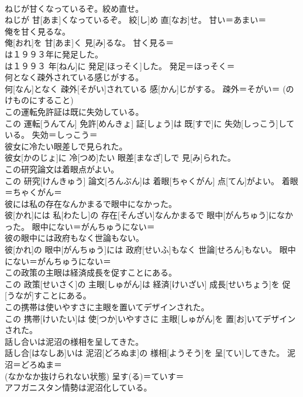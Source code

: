 \documentclass[8pt]{extreport}
\begin{document}
\begin{CJK}{UTF8}{min}
{\\	ねじが甘くなっているぞ。絞め直せ。	
\\	ねじが 甘[あま]くなっているぞ。 絞[し]め 直[なお]せ。	甘い＝あまい＝ 
\\	俺を甘く見るな。	
\\	俺[おれ]を 甘[あま]く 見[み]るな。	甘く見る＝ 
\\	は１９９３年に発足した。	
\\	は１９９３ 年[ねん]に 発足[ほっそく]した。	発足＝ほっそく＝ 
\\	何となく疎外されている感じがする。	
\\	何[なん]となく 疎外[そがい]されている 感[かん]じがする。	疎外＝そがい＝ (のけものにすること) 
\\	この運転免許証は既に失効している。	
\\	この 運転[うんてん] 免許[めんきょ] 証[しょう]は 既[すで]に 失効[しっこう]している。	失効＝しっこう＝ 
\\	彼女に冷たい眼差しで見られた。	
\\	彼女[かのじょ]に 冷[つめ]たい 眼差[まなざ]しで 見[み]られた。	
\\	この研究論文は着眼点がよい。	
\\	この 研究[けんきゅう] 論文[ろんぶん]は 着眼[ちゃくがん] 点[てん]がよい。	着眼＝ちゃくがん＝ 
\\	彼には私の存在なんかまるで眼中になかった。	
\\	彼[かれ]には 私[わたし]の 存在[そんざい]なんかまるで 眼中[がんちゅう]になかった。	眼中にない＝がんちゅうにない＝ 
\\	彼の眼中には政府もなく世論もない。	
\\	彼[かれ]の 眼中[がんちゅう]には 政府[せいふ]もなく 世論[せろん]もない。	眼中にない＝がんちゅうにない＝ 
\\	この政策の主眼は経済成長を促すことにある。	
\\	この 政策[せいさく]の 主眼[しゅがん]は 経済[けいざい] 成長[せいちょう]を 促[うなが]すことにある。	
\\	この携帯は使いやすさに主眼を置いてデザインされた。	
\\	この 携帯[けいたい]は 使[つか]いやすさに 主眼[しゅがん]を 置[お]いてデザインされた。	
\\	話し合いは泥沼の様相を呈してきた。	
\\	話し合[はなしあ]いは 泥沼[どろぬま]の 様相[ようそう]を 呈[てい]してきた。	泥沼＝どろぬま＝ 
\\	(なかなか抜けられない状態) 呈す(る)＝ていす＝ 
\\	アフガニスタン情勢は泥沼化している。	
}
\end{CJK}
\end{document}
